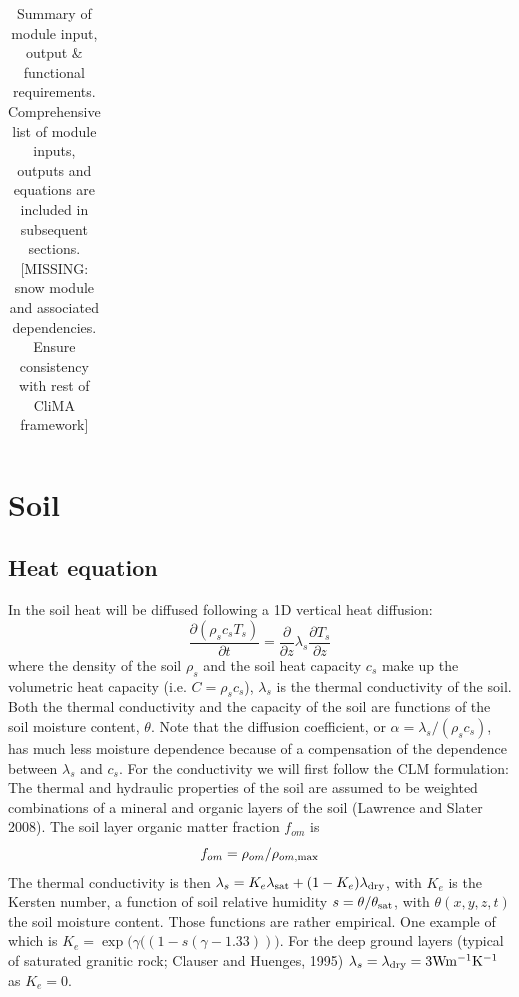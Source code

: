 \documentclass{article}
\begin{document}
\begin{table}[]
{\begin{tabular}{|l|l|l|l|}
\end{tabular}%
}
\caption{\label{tab:LM-modules}Summary of module input, output & functional requirements. Comprehensive list of module inputs, outputs and equations are included in subsequent sections. [MISSING: snow module and associated dependencies. Ensure consistency with rest of CliMA framework]}
\end{table}


\section{Soil}

\subsection{Heat equation}
In the soil heat will be diffused following a 1D vertical heat diffusion:
\begin{equation}
     \frac{\partial (\rho_s c_s T_s) }{\partial t} = \frac{\partial }{\partial z}\lambda_s \frac{\partial T_s }{\partial z}
\end{equation}
where the density of the soil $\rho_{s}$ and the soil heat capacity $c_s$ make up the volumetric heat capacity (i.e. $C = \rho_s c_s$), $\lambda_{s}$ is the thermal conductivity of the soil. Both the thermal conductivity and the capacity of the soil are functions of the soil moisture content, $\theta$. Note that the diffusion coefficient, or $\alpha = \lambda_s/(\rho_s c_s)$, has much less moisture dependence because of a compensation of the dependence between $\lambda_s$ and $c_s$. 
For the conductivity we will first follow the CLM formulation: \\
The thermal and hydraulic properties of the soil are assumed to be weighted combinations of a mineral and organic layers of the soil (Lawrence and Slater 2008). The soil layer organic matter fraction $f_{om}$ is 
\begin{equation}
    f_{om} = \rho_{om}/\rho_{om,{\rm max}}
\end{equation}
The thermal conductivity is then $\lambda_s = K_e \lambda_{\rm sat} + (1-K_e) \lambda_{\rm dry}$, with $K_e$ is the Kersten number, a function of soil relative humidity $s=\theta/\theta_{\rm sat}$, with $\theta(x,y,z,t)$ the soil moisture content. Those functions are rather empirical. One example of which is $K_e = \exp \big( \gamma((1-s(\gamma-1.33))\big)$. For  the  deep  ground  layers  (typical  of  saturated  granitic  rock;  Clauser  and  Huenges,  1995) $\lambda_s =  \lambda_{\rm dry} = 3 \rm W  m^{-1}  K^{-1}$ as $K_e=0$.
\end{document}
